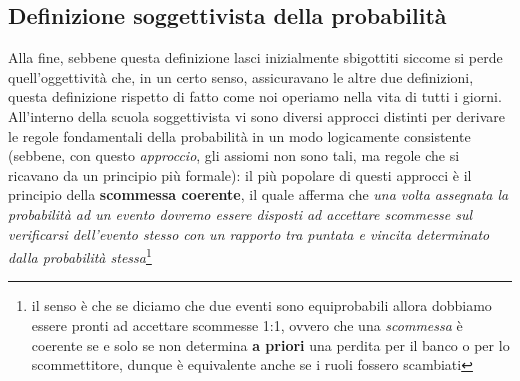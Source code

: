 \documentclass{report}
\begin{document}
	\subsection{Definizione soggettivista della probabilità}
\noindent Alla fine, sebbene questa definizione lasci inizialmente sbigottiti siccome si perde quell'oggettività che, in un certo senso, assicuravano le altre due definizioni, questa definizione rispetto di fatto come noi operiamo nella vita di tutti i giorni.
	All'interno della scuola soggettivista vi sono diversi approcci distinti per derivare le regole fondamentali della probabilità in un modo logicamente consistente (sebbene, con questo \emph{approccio}, gli assiomi non sono tali, ma regole che si ricavano da un principio più formale): il più popolare di questi approcci è il principio della \textbf{scommessa coerente}, il quale afferma che \emph{una volta assegnata la probabilità ad un evento dovremo essere disposti ad accettare scommesse sul verificarsi dell'evento stesso con un rapporto tra puntata e vincita determinato dalla probabilità stessa}\footnote{il senso è che se diciamo che due eventi sono equiprobabili allora dobbiamo essere pronti ad accettare scommesse 1:1, ovvero che una \emph{scommessa} è coerente se e solo se non determina \textbf{a priori} una perdita per il banco o per lo scommettitore, dunque è equivalente anche se i ruoli fossero scambiati} \\
\end{document}
